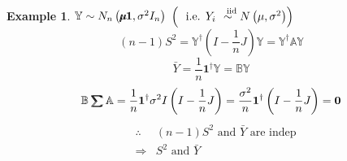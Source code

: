 \documentclass{article}
\newtheorem{example}[theorem]{Example}
\begin{document}
\bigskip

\begin{example}
$\mathbb{Y}\sim N_{n}\left( \mathbb{%
\mu\mkern-12.3mu\mu%
}\boldsymbol{1},\sigma ^{2}I_{n}\right) $ $\left( \text{i.e. }Y_{i}\overset{%
\text{iid}}{\sim }N\left( \mu ,\sigma ^{2}\right) \right) $%
\begin{equation*}
\left( n-1\right) S^{2}=\mathbb{Y}^{\dagger }\left( I-\frac{1}{n}J\right) 
\mathbb{Y=Y}^{\dagger }\mathbb{AY}
\end{equation*}%
\begin{equation*}
\bar{Y}=\frac{1}{n}\boldsymbol{1}^{\dagger }\mathbb{Y}=\mathbb{BY}
\end{equation*}%
\begin{equation*}
\mathbb{B}%
\tsum\mkern-20mu\tsum%
\mathbb{A}=\frac{1}{n}\boldsymbol{1}^{\dagger }\sigma ^{2}I\left( I-\frac{1}{%
n}J\right) =\frac{\sigma ^{2}}{n}\boldsymbol{1}^{\dagger }\left( I-\frac{1}{n%
}J\right) =\boldsymbol{0}
\end{equation*}%
\begin{eqnarray*}
&\therefore &\left( n-1\right) S^{2}\text{ and }\bar{Y}\text{ are indep} \\
&\Rightarrow &S^{2}\text{ and }\bar{Y}
\end{eqnarray*}
\end{example}

\bigskip
\end{document}
